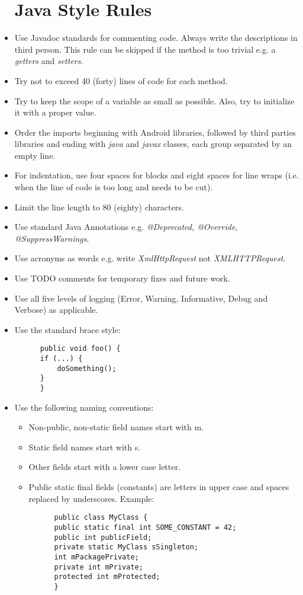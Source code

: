 \begin{itemize}
  \section{Java Style Rules}
  \item Use Javadoc standards for commenting code. Always write the descriptions in third person. This rule can be skipped if the method is too trivial e.g. a \textit{getters} and \textit{setters}.
  \item Try not to exceed 40 (forty) lines of code for each method.
  \item Try to keep the scope of a variable as small as possible. Also, try to initialize it with a proper value. 
  \item Order the imports beginning with Android libraries, followed by third parties libraries and ending with \textit{java} and \textit{javax} classes, each group separated by an empty line.
  \item For indentation, use four spaces for blocks and eight spaces for line wraps (i.e. when the line of code is too long and needs to be cut).
  \item Limit the line length to 80 (eighty) characters. 
  \item Use standard Java Annotations e.g. \textit{@Deprecated, @Override, @SuppressWarnings}.
  \item Use acronyms as words e.g. write \textit{XmlHttpRequest} not \textit{XMLHTTPRequest}.
  \item Use TODO comments for temporary fixes and future work.
  \item Use all five levels of logging (Error, Warning, Informative, Debug and Verbose) as applicable.
  \item Use the standard brace style: 
  \begin{lstlisting}
      public void foo() {
	  if (...) {
	      doSomething();
	  }
      }
  \end{lstlisting}
  \item Use the following naming conventions:
  \begin{itemize}
    \item Non-public, non-static field names start with m.
    \item Static field names start with s.
    \item Other fields start with a lower case letter.
    \item Public static final fields (constants) are letters in upper case and spaces replaced by underscores.
    Example:
      \begin{lstlisting}
      public class MyClass {
	  public static final int SOME_CONSTANT = 42;
	  public int publicField;
	  private static MyClass sSingleton;
	  int mPackagePrivate;
	  private int mPrivate;
	  protected int mProtected;
      }
      \end{lstlisting}
    \end{itemize}
  \end{itemize}

